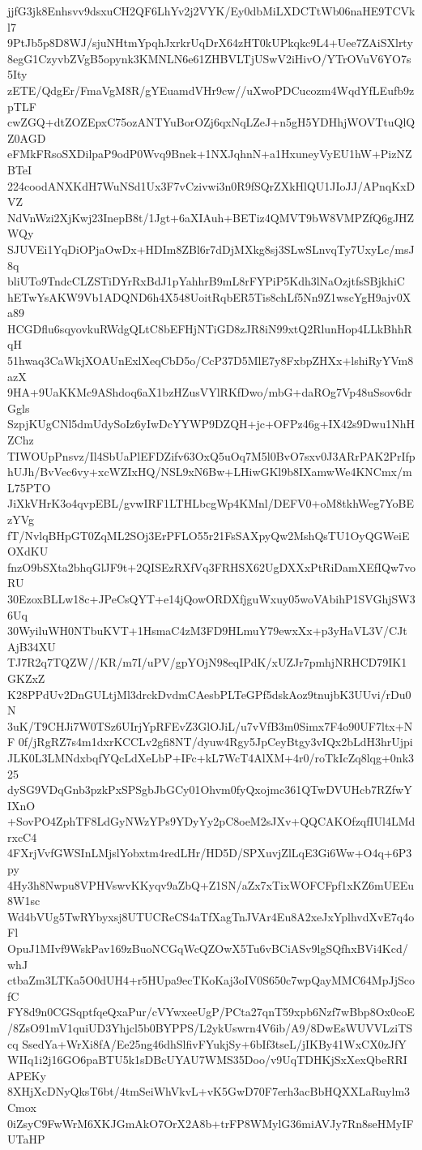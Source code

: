 jjfG3jk8Enhsvv9dsxuCH2QF6LhYv2j2VYK/Ey0dbMiLXDCTtWb06naHE9TCVkl7
9PtJb5p8D8WJ/sjuNHtmYpqhJxrkrUqDrX64zHT0kUPkqkc9L4+Uee7ZAiSXlrty
8egG1CzyvbZVgB5opynk3KMNLN6e61ZHBVLTjUSwV2iHivO/YTrOVuV6YO7s5Ity
zETE/QdgEr/FmaVgM8R/gYEuamdVHr9cw//uXwoPDCucozm4WqdYfLEufb9zpTLF
cwZGQ+dtZOZEpxC75ozANTYuBorOZj6qxNqLZeJ+n5gH5YDHhjWOVTtuQlQZ0AGD
eFMkFRsoSXDilpaP9odP0Wvq9Bnek+1NXJqhnN+a1HxuneyVyEU1hW+PizNZBTeI
224coodANXKdH7WuNSd1Ux3F7vCzivwi3n0R9fSQrZXkHlQU1JIoJJ/APnqKxDVZ
NdVnWzi2XjKwj23InepB8t/1Jgt+6aXIAuh+BETiz4QMVT9bW8VMPZfQ6gJHZWQy
SJUVEi1YqDiOPjaOwDx+HDIm8ZBl6r7dDjMXkg8sj3SLwSLnvqTy7UxyLc/msJ8q
bliUTo9TndcCLZSTiDYrRxBdJ1pYahhrB9mL8rFYPiP5Kdh3lNaOzjtfsSBjkhiC
hETwYsAKW9Vb1ADQND6h4X548UoitRqbER5Tis8chLf5Nn9Z1wscYgH9ajv0Xa89
HCGDflu6sqyovkuRWdgQLtC8bEFHjNTiGD8zJR8iN99xtQ2RlunHop4LLkBhhRqH
51hwaq3CaWkjXOAUnExlXeqCbD5o/CcP37D5MlE7y8FxbpZHXx+lshiRyYVm8azX
9HA+9UaKKMc9AShdoq6aX1bzHZusVYlRKfDwo/mbG+daROg7Vp48uSsov6drGgls
SzpjKUgCNl5dmUdySoIz6yIwDcYYWP9DZQH+jc+OFPz46g+IX42s9Dwu1NhHZChz
TIWOUpPnsvz/Il4SbUaPlEFDZifv63OxQ5uOq7M5l0BvO7sxv0J3ARrPAK2PrIfp
hUJh/BvVec6vy+xcWZIxHQ/NSL9xN6Bw+LHiwGKl9b8IXamwWe4KNCmx/mL75PTO
JiXkVHrK3o4qvpEBL/gvwIRF1LTHLbcgWp4KMnl/DEFV0+oM8tkhWeg7YoBEzYVg
fT/NvlqBHpGT0ZqML2SOj3ErPFLO55r21FsSAXpyQw2MshQsTU1OyQGWeiEOXdKU
fnzO9bSXta2bhqGlJF9t+2QISEzRXfVq3FRHSX62UgDXXxPtRiDamXEfIQw7voRU
30EzoxBLLw18c+JPeCsQYT+e14jQowORDXfjguWxuy05woVAbihP1SVGhjSW36Uq
30WyiluWH0NTbuKVT+1HsmaC4zM3FD9HLmuY79ewxXx+p3yHaVL3V/CJtAjB34XU
TJ7R2q7TQZW//KR/m7I/uPV/gpYOjN98eqIPdK/xUZJr7pmhjNRHCD79IK1GKZxZ
K28PPdUv2DnGULtjMl3drckDvdmCAesbPLTeGPf5dskAoz9tnujbK3UUvi/rDu0N
3uK/T9CHJi7W0TSz6UIrjYpRFEvZ3GlOJiL/u7vVfB3m0Simx7F4o90UF7ltx+NF
0f/jRgRZ7s4m1dxrKCCLv2gfi8NT/dyuw4Rgy5JpCeyBtgy3vIQx2bLdH3hrUjpi
JLK0L3LMNdxbqfYQcLdXeLbP+IFc+kL7WcT4AlXM+4r0/roTkIcZq8lqg+0nk325
dySG9VDqGnb3pzkPxSPSgbJbGCy01Ohvm0fyQxojmc361QTwDVUHcb7RZfwYIXnO
+SovPO4ZphTF8LdGyNWzYPs9YDyYy2pC8oeM2sJXv+QQCAKOfzqfIUl4LMdrxcC4
4FXrjVvfGWSInLMjslYobxtm4redLHr/HD5D/SPXuvjZlLqE3Gi6Ww+O4q+6P3py
4Hy3h8Nwpu8VPHVswvKKyqv9aZbQ+Z1SN/aZx7xTixWOFCFpf1xKZ6mUEEu8W1sc
Wd4bVUg5TwRYbyxsj8UTUCReCS4aTfXagTnJVAr4Eu8A2xeJxYplhvdXvE7q4oFl
OpuJ1MIvf9WskPav169zBuoNCGqWcQZOwX5Tu6vBCiASv9lgSQfhxBVi4Kcd/whJ
ctbaZm3LTKa5O0dUH4+r5HUpa9ecTKoKaj3oIV0S650c7wpQayMMC64MpJjScofC
FY8d9n0CGSqptfqeQxaPur/cVYwxeeUgP/PCta27qnT59xpb6Nzf7wBbp8Ox0coE
/8ZsO91mV1quiUD3Yhjcl5b0BYPPS/L2ykUswrn4V6ib/A9/8DwEsWUVVLziTScq
SsedYa+WrXi8fA/Ee25ng46dhSlfivFYukjSy+6bIf3tseL/jIKBy41WxCX0zJfY
WIIq1i2j16GO6paBTU5k1sDBcUYAU7WMS35Doo/v9UqTDHKjSxXexQbeRRIAPEKy
8XHjXcDNyQksT6bt/4tmSeiWhVkvL+vK5GwD70F7erh3acBbHQXXLaRuylm3Cmox
0iZsyC9FwWrM6XKJGmAkO7OrX2A8b+trFP8WMylG36miAVJy7Rn8seHMyIFUTaHP
